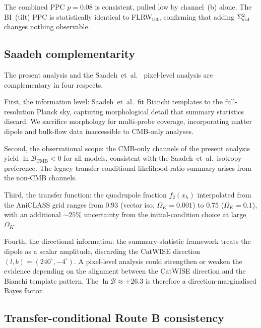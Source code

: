 The combined PPC $p = 0.08$ is consistent, pulled low by
channel~(b) alone.  The BI~(tilt) PPC is statistically
identical to FLRW$_{\mathrm{tilt}}$, confirming that adding
$\Sigma^2_{\mathrm{std}}$ changes nothing observable.


\subsection{Saadeh complementarity}\label{sec:saadeh-comp}

The present analysis and the Saadeh~et~al.~\cite{Saadeh2016b}
pixel-level analysis are complementary in four respects.

First, the information level: Saadeh~et~al.\ fit Bianchi
templates to the full-resolution Planck sky, capturing
morphological detail that summary statistics discard.  We
sacrifice morphology for multi-probe coverage, incorporating
matter dipole and bulk-flow data inaccessible to CMB-only
analyses.

Second, the observational scope: the CMB-only channels of the
present analysis yield $\ln\mathcal{B}_{\mathrm{CMB}} < 0$ for
all models, consistent with the Saadeh~et~al.\ isotropy
preference.  The legacy transfer-conditional likelihood-ratio summary arises from the non-CMB
channels.

Third, the transfer function: the quadrupole fraction
$f_2(x_h)$ interpolated from the AniCLASS grid ranges from
$0.93$ (vector iso, $\Omega_K = 0.001$) to $0.75$
($\Omega_K = 0.1$), with an additional $\sim 25\%$ uncertainty
from the initial-condition choice at large $\Omega_K$.

Fourth, the directional information: the summary-statistic
framework treats the dipole as a scalar amplitude, discarding
the CatWISE direction $(l, b) = (240^\circ, -4^\circ)$.  A
pixel-level analysis could strengthen or weaken the evidence
depending on the alignment between the CatWISE direction and
the Bianchi template pattern.  The $\ln\mathcal{B} \approx
+26.3$ is therefore a direction-marginalised Bayes factor.



\subsection{Transfer-conditional Route B consistency}
\label{sec:transfer-conditional-T2}
\label{sec:route-b}

